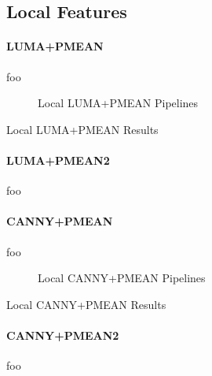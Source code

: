 \subsection{Local Features}

\paragraph{LUMA+PMEAN}

foo

\begin{figure}[h]
    \centering
    \quad
    \caption[Local LUMA+PMEAN Pipelines]{
        Local LUMA+PMEAN Pipelines
    }
    \label{fig:pipeline_local_luma_pmean}
\end{figure}

\begin{table}[h]
    
    \caption[Local LUMA+PMEAN Results]{
        Local LUMA+PMEAN Results
    }
    \label{tab:results_local_luma_pmean}
\end{table}

\paragraph{LUMA+PMEAN2}

foo

\paragraph{CANNY+PMEAN}

foo

\begin{figure}[h]
    \centering
    \quad
    \caption[Local CANNY+PMEAN Pipelines]{
        Local CANNY+PMEAN Pipelines
    }
    \label{fig:pipeline_local_luma_canny_pmean}
\end{figure}

\begin{table}[h]
    
    \caption[Local CANNY+PMEAN Results]{
        Local CANNY+PMEAN Results
    }
    \label{tab:results_local_luma_canny_pmean}
\end{table}

\paragraph{CANNY+PMEAN2}

foo
